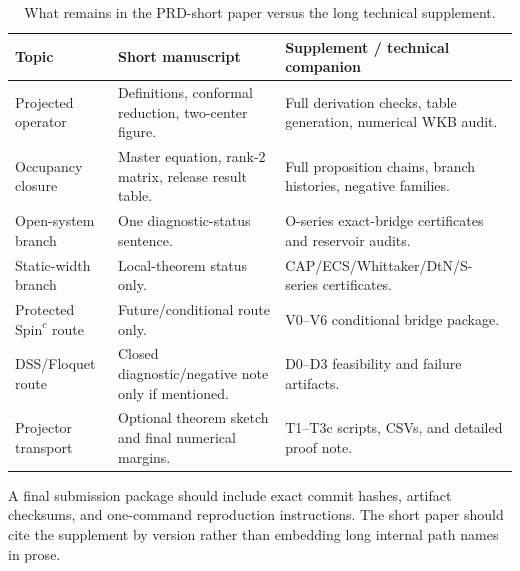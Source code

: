 \documentclass[aps,prd,onecolumn,notitlepage,nofootinbib,superscriptaddress,11pt,floatfix]{revtex4-2}
\begin{document}
\begin{table}[htbp]
\centering
\caption{What remains in the PRD-short paper versus the long technical supplement.}
\label{tab:supplement_map}
\small
\setlength{\tabcolsep}{4pt}
\renewcommand{\arraystretch}{1.12}
\begin{tabular}{@{}l l l@{}}
\toprule
\parbox[t]{0.20\textwidth}{\textbf{Topic}} & \parbox[t]{0.34\textwidth}{\textbf{Short manuscript}} & \parbox[t]{0.33\textwidth}{\textbf{Supplement / technical companion}} \\
\midrule
\parbox[t]{0.20\textwidth}{Projected operator} & \parbox[t]{0.34\textwidth}{Definitions, conformal reduction, two-center figure.} & \parbox[t]{0.33\textwidth}{Full derivation checks, table generation, numerical WKB audit.} \\
\parbox[t]{0.20\textwidth}{Occupancy closure} & \parbox[t]{0.34\textwidth}{Master equation, rank-2 matrix, release result table.} & \parbox[t]{0.33\textwidth}{Full proposition chains, branch histories, negative families.} \\
\parbox[t]{0.20\textwidth}{Open-system branch} & \parbox[t]{0.34\textwidth}{One diagnostic-status sentence.} & \parbox[t]{0.33\textwidth}{O-series exact-bridge certificates and reservoir audits.} \\
\parbox[t]{0.20\textwidth}{Static-width branch} & \parbox[t]{0.34\textwidth}{Local-theorem status only.} & \parbox[t]{0.33\textwidth}{CAP/ECS/Whittaker/DtN/S-series certificates.} \\
\parbox[t]{0.20\textwidth}{Protected \(\mathrm{Spin}^c\) route} & \parbox[t]{0.34\textwidth}{Future/conditional route only.} & \parbox[t]{0.33\textwidth}{V0--V6 conditional bridge package.} \\
\parbox[t]{0.20\textwidth}{DSS/Floquet route} & \parbox[t]{0.34\textwidth}{Closed diagnostic/negative note only if mentioned.} & \parbox[t]{0.33\textwidth}{D0--D3 feasibility and failure artifacts.} \\
\parbox[t]{0.20\textwidth}{Projector transport} & \parbox[t]{0.34\textwidth}{Optional theorem sketch and final numerical margins.} & \parbox[t]{0.33\textwidth}{T1--T3c scripts, CSVs, and detailed proof note.} \\
\bottomrule
\end{tabular}
\end{table}

A final submission package should include exact commit hashes, artifact checksums, and one-command reproduction instructions.
The short paper should cite the supplement by version rather than embedding long internal path names in prose.
\end{document}
